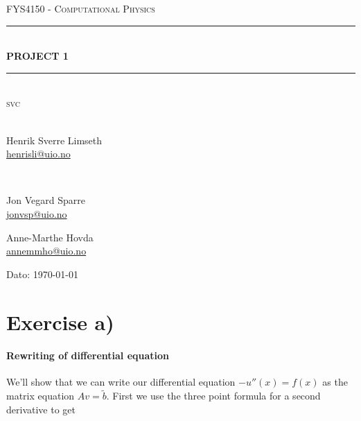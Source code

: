 \documentclass[english, 11pt]{article}
\begin{document}
\begin{titlepage}
\begin{center}

\textsc{\Large FYS4150 - Computational Physics}\\[0.5cm]
\rule{\linewidth}{0.5mm} \\[0.4cm]
{ \huge \bfseries  PROJECT 1}\\[0.10cm]
\rule{\linewidth}{0.5mm} \\[1.5cm]
\textsc{\Large svc}\\[1.5cm]
\textsc{}\\[1.5cm]

\begin{minipage}{0.49\textwidth}
    \begin{center} \large
        Henrik Sverre Limseth\\ \url{henrisli@uio.no} \\[0.8cm]
    \end{center}
\end{minipage}
\bigskip \\
\begin{minipage}{0.49\textwidth}
    \begin{center} \large
        Jon Vegard Sparre\\ \url{jonvsp@uio.no} \\[0.8cm]
    \end{center}
\end{minipage}
\begin{minipage}{0.49\textwidth}
    \begin{center} \large
        Anne-Marthe Hovda\\ \url{annemmho@uio.no} \\[0.8cm]
    \end{center}
\end{minipage}

\vfill

\large{Dato: \today}

\end{center}
\end{titlepage}

\abstract{}

\section*{Exercise a)}

\paragraph{Rewriting of differential equation}
We'll show that we can write our differential equation $-u''(x) = f(x)$ as the matrix equation $ Av = \tilde b$. First we use the three point formula for a second derivative to get
\end{document}
